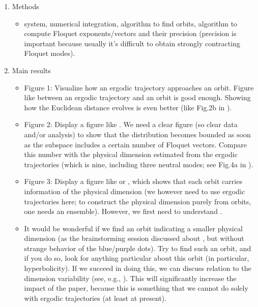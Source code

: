 \begin{description}
\begin{enumerate}
\item Methods
\begin{itemize}
\item system, numerical integration, algorithm to find orbits,
 algorithm to compute Floquet exponents/vectors and their precision
 (precision is important because usually it's difficult to obtain
 strongly contracting Floquet modes).
\end{itemize}

\item Main results
\begin{itemize}

\item Figure 1: Visualize how an ergodic trajectory approaches an orbit.
Figure like  between an ergodic trajectory and an orbit
 is good enough. Showing how the Euclidean distance evolves is even better
 (like Fig.2b in ).

\item Figure 2: Display a figure like .
We need a clear figure (so clear data and/or analysis) to show that
the distribution becomes bounded as soon as the subspace includes
 a certain number of Floquet vectors.
Compare this number with the physical dimension
 estimated from the ergodic trajectories
 (which is nine, including three neutral modes; see Fig.4a in ).

\item Figure 3: Display a figure like 
 or , which shows that each orbit carries
 information of the physical dimension
 (we however need to use ergodic trajectories here;
 to construct the physical dimension purely from orbits,
 one needs an ensemble).
However, we first need to understand .

\item It would be wonderful
 if we find an orbit indicating a smaller physical dimension
 (as the brainstorming session discussed
 about , but without strange behavior
 of the blue/purple dots).
Try to find such an orbit, and if you do so, look for anything particular
 about this orbit (in particular, hyperbolicity).
If we succeed in doing this, we can discuss relation
 to the dimension variability (see, e.g., ).
This will significantly increase the impact of the paper,
 because this is something that we cannot do solely with ergodic trajectories
 (at least at present).
\end{itemize}


\end{enumerate}
\end{description}
